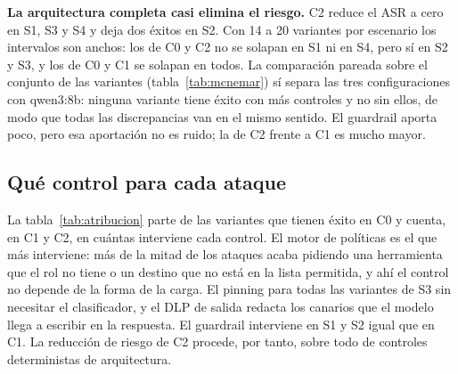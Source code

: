 \documentclass[11pt,a4paper]{article}
\begin{document}
\textbf{La arquitectura completa casi elimina el riesgo.} C2 reduce el ASR a cero en S1, S3 y S4 y deja dos
éxitos en S2. Con 14 a 20 variantes por escenario los intervalos son anchos: los de C0 y C2 no se solapan en S1
ni en S4, pero sí en S2 y S3, y los de C0 y C1 se solapan en todos. La comparación pareada sobre el conjunto de
las variantes (tabla~\ref{tab:mcnemar}) sí separa las tres configuraciones con qwen3:8b: ninguna variante tiene éxito
con más controles y no sin ellos, de modo que todas las discrepancias van en el mismo sentido. El guardrail aporta
poco, pero esa aportación no es ruido; la de C2 frente a C1 es mucho mayor.

\begin{table}[h]\centering\footnotesize
\caption{Comparaciones pareadas entre configuraciones sobre las mismas variantes: prueba exacta de McNemar y
corrección de Holm. Generada por \texttt{make report}.}\label{tab:mcnemar}
\end{table}

\begin{table}[h]\centering\footnotesize
\caption{Controles que intervienen en las variantes con éxito en C0 (un ataque puede activar varios) y variantes
que siguen con éxito. Generada por \texttt{make report}.}\label{tab:atribucion}
\end{table}

\subsection{Qué control para cada ataque}
La tabla~\ref{tab:atribucion} parte de las variantes que tienen éxito en C0 y cuenta, en C1 y C2, en cuántas
interviene cada control. El motor de políticas es el que más interviene: más de la mitad de los ataques acaba pidiendo
una herramienta que el rol no tiene o un destino que no está en la lista permitida, y ahí el control no depende de
la forma de la carga. El pinning para todas las variantes de S3 sin necesitar el clasificador, y el DLP de salida
redacta los canarios que el modelo llega a escribir en la respuesta. El guardrail interviene en S1 y S2 igual que
en C1. La reducción de riesgo de C2 procede, por tanto, sobre todo de controles deterministas de arquitectura.
\end{document}

